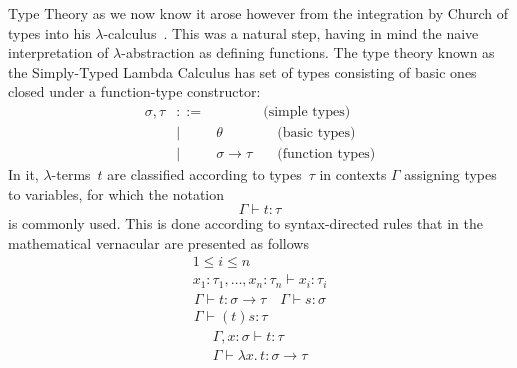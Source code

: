 \documentclass[11pt,twocolumn]{article}
\newcommand{\lcalculus}{\mbox{$\lambda$-calculus}}
\begin{document}
Type Theory as we now know it arose however from the integration by Church
of types into his \lcalculus~\cite{Church1940}.  This was a natural step,
having in mind the naive interpretation of \mbox{$\lambda$-abstraction} as
defining functions.  The type theory known as the Simply-Typed Lambda
Calculus has set of types consisting of basic ones closed under a
function-type constructor:
  \[\begin{array}{rcll}
    \sigma,\tau & ::= & & \mbox{(simple types)}\\
    & \mid & \theta & \quad\mbox{(basic types)}\\
    & \mid & \sigma\to\tau & \quad\mbox{(function types)}
  \end{array}\]
In it, \mbox{$\lambda$-terms}~$t$ are classified according to types~$\tau$ in
contexts $\Gamma$ assigning types to variables, for which the notation
  \[
  \Gamma\vdash t:\tau
\]
is commonly used.  This is done according to syntax-directed rules that in the
mathematical vernacular are presented as follows
  \[\begin{array}{c}
    1\leq i\leq n
    \\ \hline
    x_1:\tau_1,\ldots,x_n:\tau_n\vdash x_i:\tau_i
  \end{array}\]
  \[\begin{array}{c}
    \Gamma\vdash t:\sigma\to\tau
    \quad 
    \Gamma\vdash s:\sigma
    \\ \hline
    \Gamma\vdash (t)s:\tau
  \end{array}\]
  \begin{equation}\label{LambdaAbstraction} 
  \begin{array}{c}
    \Gamma,x:\sigma\vdash t:\tau
    \\ \hline
    \Gamma\vdash\lambda x.\,t:\sigma\to\tau
  \end{array}
\end{equation}
\end{document}
